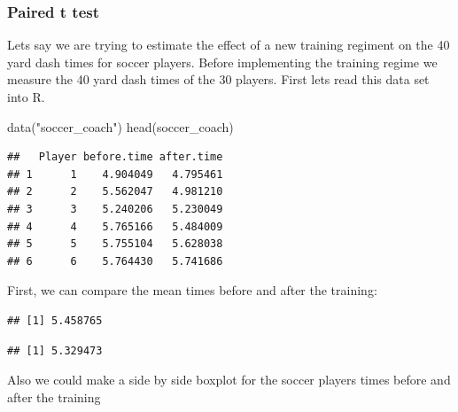 \documentclass[
]{book}
\newenvironment{Shaded}{\begin{snugshade}}{\end{snugshade}}
\newcommand{\FunctionTok}[1]{\textcolor[rgb]{0.00,0.00,0.00}{#1}}
\newcommand{\NormalTok}[1]{#1}
\newcommand{\SpecialCharTok}[1]{\textcolor[rgb]{0.00,0.00,0.00}{#1}}
\newcommand{\StringTok}[1]{\textcolor[rgb]{0.31,0.60,0.02}{#1}}
\theoremstyle{definition}
\theoremstyle{definition}
\theoremstyle{definition}
\theoremstyle{definition}
\theoremstyle{remark}
\begin{document}
\hypertarget{paired-t-test}{%
\subsubsection{Paired t test}\label{paired-t-test}}

Lets say we are trying to estimate the effect of a new training regiment on the 40 yard dash times for soccer players. Before implementing the training regime we measure the 40 yard dash times of the 30 players. First lets read this data set into R.

\begin{Shaded}
\begin{Highlighting}[]
\FunctionTok{data}\NormalTok{(}\StringTok{"soccer\_coach"}\NormalTok{)}
\FunctionTok{head}\NormalTok{(soccer\_coach)}
\end{Highlighting}
\end{Shaded}

\begin{verbatim}
##   Player before.time after.time
## 1      1    4.904049   4.795461
## 2      2    5.562047   4.981210
## 3      3    5.240206   5.230049
## 4      4    5.765166   5.484009
## 5      5    5.755104   5.628038
## 6      6    5.764430   5.741686
\end{verbatim}

First, we can compare the mean times before and after the training:

\begin{Shaded}
\end{Shaded}

\begin{verbatim}
## [1] 5.458765
\end{verbatim}

\begin{Shaded}
\end{Shaded}

\begin{verbatim}
## [1] 5.329473
\end{verbatim}

Also we could make a side by side boxplot for the soccer players times before and after the training
\end{document}
